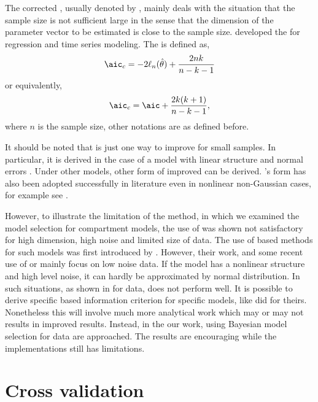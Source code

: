 The corrected \aic, usually denoted by \aicc, mainly deals with the situation
that the sample size is not sufficient large in the sense that the dimension
of the parameter vector to be estimated is close to the sample size.
\cite{Hurvich:1989ev} developed the \aicc for regression and time series
modeling. The \aicc is defined as,
\begin{equation}
  \text{\aicc} = -2\ell_n(\hat\theta) + \frac{2nk}{n-k-1}
\end{equation}
or equivalently,
\begin{equation}
  \text{\aicc} = \text{\aic} + \frac{2k(k+1)}{n-k-1},
\end{equation}
where $n$ is the sample size, other notations are as defined before.

It should be noted that \aicc is just one way to improve \aic for small
samples. In particular, it is derived in the case of a model with linear
structure and normal errors \cite{Hurvich:1989ev, Burnham:2002wc}. Under other
models, other form of improved \aic can be derived. \cite{Hurvich:1989ev}'s
form has also been adopted successfully in literature even in nonlinear
non-Gaussian cases, for example see \cite{Turkheimer:2003iy}.

However, to illustrate the limitation of the \aicc method, in
\cite{Zhou:2011uo} which we examined the model selection for compartment
models, the use of \aicc was shown not satisfactory for high dimension, high
noise and limited size of data. The use of \aic based methods for such models
was first introduced by \cite{Hawkins:1986ha}. However, their work, and some
recent use of \aic or \aicc mainly focus on low noise data. If the model has a
nonlinear structure and high level noise, it can hardly be approximated by
normal distribution. In such situations, as shown in \cite{Zhou:2011uo} for
\pet data, \aicc does not perform well. It is possible to derive specific \aic
based information criterion for specific models, like \cite{Hurvich:1989ev}
did for theirs. Nonetheless this will involve much more analytical work which
may or may not results in improved results.  Instead, in the our work, using
Bayesian model selection for \pet data are approached. The results are
encouraging while the implementations still has limitations.

\section{Cross validation}
\label{sec:Cross validation}

